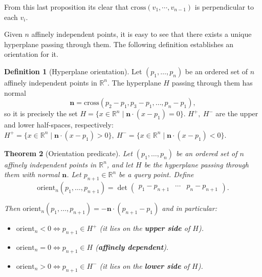 \documentclass[12pt]{article}
\newtheorem{theorem}{Theorem}
\theoremstyle{definition}
\newtheorem{definition}[theorem]{Definition}
\theoremstyle{remark}
\begin{document}
From this last proposition its clear that $\mathrm{cross}\left(v_1, \cdots, v_{n-1}\right)$ is perpendicular to each $v_i$.


\medskip
Given $n$ affinely independent points, it is easy to see that there exists a unique hyperplane passing through them. The following definition establishes an orientation for it.
\begin{definition}[Hyperplane orientation]
    Let $(p_1, \ldots, p_{n})$ be an ordered set of $n$ affinely independent points in $\mathbb{R}^n$. The hyperplane $H$ passing through them has normal 
\begin{equation*}
    \mathbf{n} = \mathrm{cross}\left( p_2 -p_1, p_3 -p_1, \ldots, p_n-p_1\right),
\end{equation*}
so it is precisely the set $H = \{ x \in \mathbb{R}^n \mid \mathbf{n} \cdot (x - p_1) = 0\}$. $H^+, \ H^-$ are the upper and lower half-spaces, respectively: $H^+ = \{ x \in \mathbb{R}^n \mid \mathbf{n} \cdot (x - p_1) > 0\}, \ H^-=\{ x \in \mathbb{R}^n \mid \mathbf{n} \cdot (x - p_1) < 0\}$.
\end{definition}

\begin{theorem}[Orientation predicate]\label{thm:orient}
    Let $(p_1, \ldots, p_{n})$ be an ordered set of $n$ affinely independent points in $\mathbb{R}^n$, and let $H$ be the hyperplane passing through them with normal $\mathbf{n}$. Let $p_{n+1} \in \mathbb{R}^n$ be a query point. Define
\begin{equation*}
    \mathrm{orient}_{n}(p_1, \ldots, p_{n+1}) = \det 
\left( \begin{array}{c|c|c}
        p_1 - p_{n+1} & \cdots & p_{n} - p_{n+1} 
\end{array} \right).
\end{equation*}

\noindent
Then $\mathrm{orient}_{n}(p_1, \ldots, p_{n+1}) = - \mathbf{n} \cdot (p_{n+1} - p_1)$ 
and in particular:
\begin{itemize}
    \item $\mathrm{orient}_{n} < 0 \iff p_{n+1} \in H^+$ (it lies on the \textbf{upper side} of $H$).
    \item $\mathrm{orient}_{n} = 0 \iff p_{n+1} \in H$ (\textbf{affinely dependent}).
    \item $\mathrm{orient}_{n} > 0 \iff p_{n+1} \in H^-$ (it lies on the \textbf{lower side} of $H$).
\end{itemize}
\end{theorem}
\end{document}
